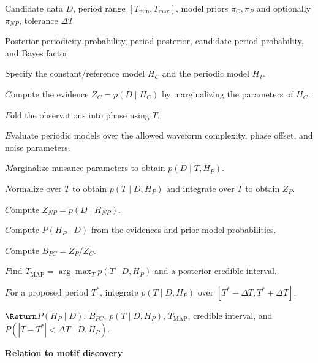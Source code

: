 \documentclass{book}
\providecommand{\ProjectDeepHeading}[2]{%
    \par\medskip\noindent\textbf{#2}\par\smallskip
}
\providecommand{\State}[1]{\ensuremath{#1}}
\begin{document}
\begin{algorithm}[H]
\caption{Bayesian periodicity detection for a candidate subsequence}
\begin{algorithmic}[1]

\Require Candidate data $D$, period range $[T_{\min},T_{\max}]$, model priors $\ensuremath{\pi}_C,\ensuremath{\pi}_P$ and optionally $\ensuremath{\pi}_{NP}$, tolerance $\ensuremath{\Delta} T$

\Ensure Posterior periodicity probability, period posterior, candidate-period probability, and Bayes factor

\State Specify the constant/reference model $H_C$ and the periodic model $H_P$.

\State Compute the evidence $Z_C=p(D\mid H_C)$ by marginalizing the parameters of $H_C$.


    \State Fold the observations into phase using $T$.

    \State Evaluate periodic models over the allowed waveform complexity, phase offset, and noise parameters.

    \State Marginalize nuisance parameters to obtain $p(D\mid T,H_P)$.

\EndFor

\State Normalize over $T$ to obtain $p(T\mid D,H_P)$ and integrate over $T$ to obtain $Z_P$.


    \State Compute $Z_{NP}=p(D\mid H_{NP})$.

\EndIf

\State Compute $P(H_P\mid D)$ from the evidences and prior model probabilities.

\State Compute $B_{PC}=Z_P/Z_C$.

\State Find $T_{\mathrm{MAP}}=\arg\max_T p(T\mid D,H_P)$ and a posterior credible interval.

\State For a proposed period $T^{\ast}$, integrate $p(T\mid D,H_P)$ over $[T^{\ast}-\ensuremath{\Delta} T,T^{\ast}+\ensuremath{\Delta} T]$.

\State \Return $P(H_P\mid D)$, $B_{PC}$, $p(T\mid D,H_P)$, $T_{\mathrm{MAP}}$, credible interval, and $P(|T-T^{\ast}|<\ensuremath{\Delta} T\mid D,H_P)$.

\end{algorithmic}
\end{algorithm}

\ProjectDeepHeading{4}{Relation to motif discovery}
\end{document}
